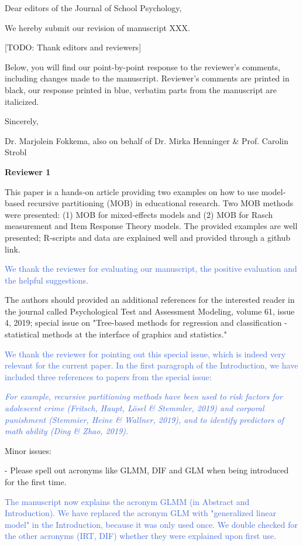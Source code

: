 \documentclass{letter}
\newcommand{\auth}[1]{\textcolor{RoyalBlue}{#1}}
\begin{document}
Dear editors of the Journal of School Psychology,

We hereby submit our revision of manuscript XXX.

[TODO: Thank editors and reviewers]

Below, you will find our point-by-point response to the reviewer's comments, including changes made to the manuscript. Reviewer's comments are printed in black, our response printed in blue, verbatim parts from the manuscript are italicized. 

Sincerely,

Dr. Marjolein Fokkema, also on behalf of Dr. Mirka Henninger & Prof. Carolin Strobl


\textbf{Reviewer 1}

This paper is a hands-on article providing two examples on how to use model-based recursive partitioning (MOB) in educational research. Two MOB methods were presented: (1) MOB for mixed-effects models and (2) MOB for Rasch measurement and Item Response Theory models. The provided examples are well presented; R-scripts and data are explained well and provided through a github link.

\auth{We thank the reviewer for evaluating our manuscript, the positive evaluation and the helpful suggestions.}

The authors should provided an additional references for the interested reader in the journal called Psychological Test and Assessment Modeling, volume 61, issue 4, 2019; special issue on "Tree-based methods for regression and classification - statistical methods at the interface of graphics and statistics."

\auth{We thank the reviewer for pointing out this special issue, which is indeed very relevant for the current paper. In the first paragraph of the Introduction, we have included three references to papers from the special issue:} 

\auth{\textit{For example, recursive partitioning methods have been used to risk factors for adolescent crime (Fritsch, Haupt, Lösel \& Stemmler, 2019) and corporal punishment (Stemmier, Heine \& Wallner, 2019), and to identify predictors of math ability (Ding \& Zhao, 2019).}}


Minor issues:

- Please spell out acronyms like GLMM, DIF and GLM when being introduced for the first time.

\auth{The manuscript now explains the acronym GLMM (in Abstract and Introduction). We have replaced the acronym GLM with "generalized linear model" in the Introduction, because it was only used once. We double checked for the other acronyms (IRT, DIF) whether they were explained upon first use.}
\end{document}
